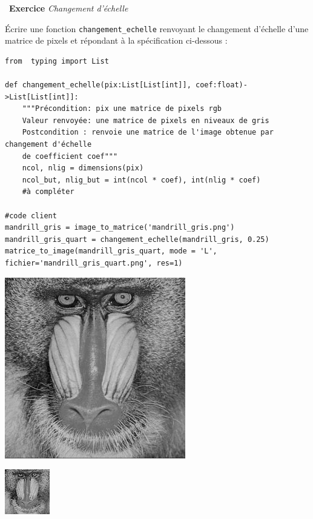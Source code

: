 \documentclass[a4paper, french, 12pt]{article}
\newcounter{exo}
\newenvironment{exercice}[1]
{\par \medskip   \addtocounter{exo}{1} \noindent  
\begin{bclogo}[arrondi =0.1,   noborder = true, logo=\bccrayon, marge=4]{~\textbf{Exercice} \textbf{\theexo} {\itshape #1} }  \par}
{
\end{bclogo}
 \par \bigskip }
\newcounter{def}
\begin{document}
\begin{exercice}{Changement d'échelle}

Écrire une fonction  \texttt{changement\_echelle} renvoyant le changement d'échelle d'une matrice de pixels et répondant à la spécification ci-dessous :
	
\begin{lstlisting}[style=rond]
from  typing import List

def changement_echelle(pix:List[List[int]], coef:float)->List[List[int]]:
    """Précondition: pix une matrice de pixels rgb
    Valeur renvoyée: une matrice de pixels en niveaux de gris
    Postcondition : renvoie une matrice de l'image obtenue par changement d'échelle
    de coefficient coef"""
    ncol, nlig = dimensions(pix)
    ncol_but, nlig_but = int(ncol * coef), int(nlig * coef)
    #à compléter

#code client
mandrill_gris = image_to_matrice('mandrill_gris.png')
mandrill_gris_quart = changement_echelle(mandrill_gris, 0.25)
matrice_to_image(mandrill_gris_quart, mode = 'L', fichier='mandrill_gris_quart.png', res=1)
\end{lstlisting}

\begin{minipage}{0.45\linewidth}
\begin{center}

\medskip

\includegraphics[scale=1]{images/mandrill_gris.png}

\end{center}
\end{minipage}\hfill
\begin{minipage}{0.45\linewidth}
\begin{center}

\medskip

\includegraphics[scale=1]{images/mandrill_gris_quart.png}

\end{center}
\end{minipage}

\end{exercice}



\tableofcontents
 
\end{document}

